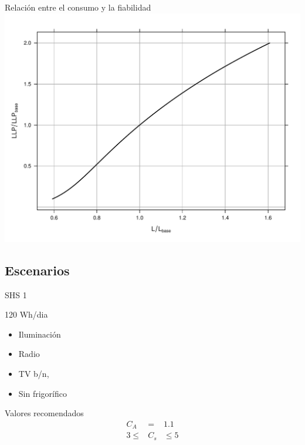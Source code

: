 \documentclass[xcolor={usenames,svgnames,dvipsnames}]{beamer}
\begin{document}
\begin{frame}[label=sec-2-1-3]{Relación entre el consumo y la fiabilidad}
\includegraphics[width=.9\linewidth]{../figs/ConsumoLLP.pdf}
\end{frame}

\subsection{Escenarios}
\label{sec-2-2}
\begin{frame}[label=sec-2-2-1]{SHS 1}
\begin{block}{120 Wh/dia}
\begin{itemize}
\item Iluminación

\item Radio

\item TV b/n,

\item Sin frigorífico
\end{itemize}
\end{block}

\begin{block}{Valores recomendados}
$$\begin{aligned}
C_{A} & = & 1.1\\
3\leq & C_{s} & \leq5
\end{aligned}$$
\end{block}
\end{frame}
\end{document}
